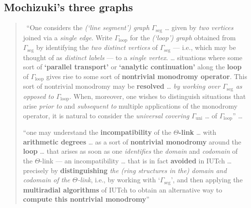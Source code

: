 \documentclass[11pt,a4paper]{article}
\newcommand{\lab}[2]{{\upshape\fcolorbox{#1}{#1!8}{\scriptsize\sffamily\bfseries\textcolor{#1}{#2}}}}
\newcommand{\tagS}{\lab{blue}{S}}
\newcommand{\q}[1]{``#1''}
\newcommand{\srcquote}[2]{\begin{quote}\small\tagS\ #1\par\nopagebreak\hfill{\footnotesize #2}\end{quote}}
\theoremstyle{plain}
\theoremstyle{definition}
\theoremstyle{remark}
\begin{document}
\subsection{Mochizuki's three graphs}
\srcquote{\q{One considers the \emph{(`line segment') graph} $\Gamma_{\mathrm{seg}}$ \dots{} given by \emph{two vertices}
joined via a \emph{single edge}. Write $\Gamma_{\mathrm{loop}}$ for the \emph{(`loop') graph} obtained from
$\Gamma_{\mathrm{seg}}$ by identifying the \emph{two distinct vertices} of $\Gamma_{\mathrm{seg}}$ --- i.e., which may be
thought of as \emph{distinct labels} --- to a \emph{single vertex}. \dots{} situations where some sort of
\textbf{`parallel transport'} or \textbf{`analytic continuation'} along the \textbf{loop} of $\Gamma_{\mathrm{loop}}$ gives
rise to some sort of \textbf{nontrivial monodromy operator}. This sort of nontrivial monodromy may be \textbf{resolved}
\dots{} \emph{by working over $\Gamma_{\mathrm{seg}}$ as opposed to $\Gamma_{\mathrm{loop}}$}. When, moreover, one wishes
to distinguish situations that arise \emph{prior to} and \emph{subsequent to} multiple applications of the monodromy
operator, it is natural to consider the \emph{universal covering} $\Gamma_{\mathrm{uni}}$ \dots{} of
$\Gamma_{\mathrm{loop}}$} \dots\par
\q{one may understand the \textbf{incompatibility} of the \textbf{\boldmath$\Theta$-link} \dots{} with \textbf{arithmetic
degrees} \dots{} as a sort of \textbf{nontrivial monodromy} around the \textbf{loop} \dots{} that arises as soon as one
\emph{identifies} the \emph{domain} and \emph{codomain} of the $\Theta$-link --- an incompatibility \dots{} that is in fact
\textbf{avoided} in IUTch \dots{} precisely by \textbf{distinguishing} \emph{the (ring structures in the) domain and
codomain of the $\Theta$-link}, i.e., by working with `$\Gamma_{\mathrm{seg}}$', and then applying the \textbf{multiradial
algorithms} of IUTch to obtain an alternative way to \textbf{compute this nontrivial monodromy}}}{\cite[\S14, (LbEx1)]{R18}}
\end{document}
